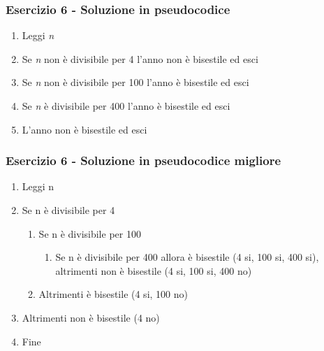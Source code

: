 \documentclass[handout]{beamer}
\begin{document}
\begin{frame}
\frametitle{Esercizio 6 - Soluzione in pseudocodice}
\begin{enumerate}
	\item Leggi \emph{n}
	\item Se \emph{n} non è divisibile per 4 l'anno \alert{non è} bisestile ed esci
	\item Se \emph{n} non è divisibile per 100 l'anno \alert{è} bisestile ed esci
	\item Se \emph{n} è divisibile per 400 l'anno \alert{è} bisestile ed esci
	\item L'anno \alert{non è} bisestile ed esci 
\end{enumerate}
\end{frame}

\begin{frame}
\frametitle{Esercizio 6 - Soluzione in pseudocodice migliore}
\begin{enumerate}
	\item Leggi n
	\item Se n è divisibile per 4
	\begin{enumerate}
		\item Se n è divisibile per 100
		\begin{enumerate}
			\item Se n è divisibile per 400 allora \alert{è} bisestile (4 si, 100 si, 400 si), altrimenti \alert{non è} bisestile (4 si, 100 si, 400 no)
		\end{enumerate}
		\item Altrimenti \alert{è} bisestile (4 si, 100 no)
	\end{enumerate}
	\item Altrimenti \alert{non è} bisestile (4 no)
	\item Fine
\end{enumerate}
\end{frame}
\end{document}
